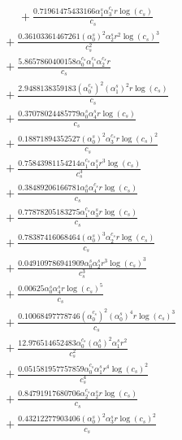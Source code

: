 \documentclass[10pt]{article}
\begin{document}
\begin{align*}
\phantom{R_{0,7}} &\phantom{={}}{}  + \frac{0.71961475433166 \alpha_{1}^s \alpha_{3}^{c_s} r \log{\left(c_{s} \right)}}{c_{s}} \\
&{}  + \frac{0.36103361467261 \left(\alpha_{0}^s\right)^{2} \alpha_{2}^s r^{2} \log{\left(c_{s} \right)}^{3}}{c_{s}^{2}} \\
&{}  + \frac{5.8657860400158 \alpha_{0}^{c_s} \alpha_{1}^{c_s} \alpha_{2}^{c_s} r}{c_{s}} \\
&{}  + \frac{2.9488138359183 \left(\alpha_{0}^{c_s}\right)^{2} \left(\alpha_{1}^s\right)^{2} r \log{\left(c_{s} \right)}}{c_{s}} \\
&{}  + \frac{0.37078024485779 \alpha_{0}^s \alpha_{4}^s r \log{\left(c_{s} \right)}}{c_{s}} \\
&{}  + \frac{0.18871894352527 \left(\alpha_{0}^s\right)^{2} \alpha_{3}^{c_s} r \log{\left(c_{s} \right)}^{2}}{c_{s}} \\
&{}  + \frac{0.75843981154214 \alpha_{1}^{c_s} \alpha_{1}^s r^{3} \log{\left(c_{s} \right)}}{c_{s}^{3}} \\
&{}  + \frac{0.38489206166781 \alpha_{0}^s \alpha_{4}^{c_s} r \log{\left(c_{s} \right)}}{c_{s}} \\
&{}  + \frac{0.77878205183275 \alpha_{1}^{c_s} \alpha_{3}^s r \log{\left(c_{s} \right)}}{c_{s}} \\
&{}  + \frac{0.78387416068464 \left(\alpha_{0}^s\right)^{3} \alpha_{2}^{c_s} r \log{\left(c_{s} \right)}}{c_{s}} \\
&{}  + \frac{0.049109786941909 \alpha_{0}^s \alpha_{2}^s r^{3} \log{\left(c_{s} \right)}^{3}}{c_{s}^{3}} \\
&{}  + \frac{0.00625 \alpha_{0}^s \alpha_{4}^s r \log{\left(c_{s} \right)}^{5}}{c_{s}} \\
&{}  + \frac{0.10068497778746 \left(\alpha_{0}^{c_s}\right)^{2} \left(\alpha_{0}^s\right)^{4} r \log{\left(c_{s} \right)}^{3}}{c_{s}} \\
&{}  + \frac{12.976514652483 \alpha_{0}^{c_s} \left(\alpha_{0}^s\right)^{2} \alpha_{1}^s r^{2}}{c_{s}^{2}} \\
&{}  + \frac{0.051581957757859 \alpha_{0}^{c_s} \alpha_{1}^s r^{4} \log{\left(c_{s} \right)}^{2}}{c_{s}^{4}} \\
&{}  + \frac{0.84791917680706 \alpha_{2}^{c_s} \alpha_{2}^s r \log{\left(c_{s} \right)}}{c_{s}} \\
&{}  + \frac{0.43212277903406 \left(\alpha_{0}^s\right)^{2} \alpha_{3}^s r \log{\left(c_{s} \right)}^{2}}{c_{s}} \\

\end{align*}
\end{document}
